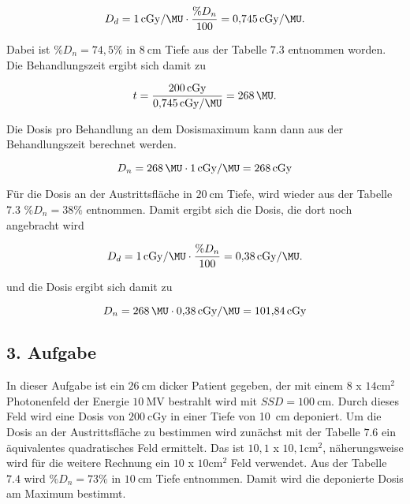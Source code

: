 \begin{equation*}
  D_d = \SI{1}{\centi\gray\per\MU} \cdot \frac{\%D_n}{100} = \SI{0.745}{\centi\gray\per\MU}.
\end{equation*}

Dabei ist $\%D_n = 74,5 \%$ in $\SI{8}{\centi\meter}$ Tiefe aus der
Tabelle $7.3$
entnommen worden.
Die Behandlungszeit ergibt sich damit zu

\begin{equation*}
  t = \frac{\SI{200}{\centi\gray}}{\SI{0.745}{\centi\gray\per\MU}} = \SI{268}{\MU}.
\end{equation*}

Die Dosis pro Behandlung an dem Dosismaximum kann dann aus der Behandlungszeit
berechnet werden.

\begin{equation*}
  D_n = \SI{268}{\MU} \cdot \SI{1}{\centi\gray\per\MU} = \SI{268}{\centi\gray}
\end{equation*}

Für die Dosis an der Austrittsfläche in $\SI{20}{\centi\meter}$ Tiefe,
wird wieder aus der Tabelle $7.3$ $\%D_n = 38\%$ entnommen.
Damit ergibt sich die Dosis, die dort noch angebracht wird

\begin{equation*}
    D_d = \SI{1}{\centi\gray\per\MU} \cdot \frac{\%D_n}{100} = \SI{0.38}{\centi\gray\per\MU}.
\end{equation*}

und die Dosis ergibt sich damit zu

\begin{equation*}
  D_n = \SI{268}{\MU} \cdot \SI{0.38}{\centi\gray\per\MU} = \SI{101,84}{\centi\gray}
\end{equation*}

\subsection*{3. Aufgabe}

In dieser Aufgabe ist ein $\SI{26}{\centi\meter}$ dicker Patient gegeben, der
mit einem $8$ x $14 \si{\centi\meter\squared}$ Photonenfeld der Energie
$\SI{10}{\mega\volt}$ bestrahlt wird mit $SSD = \SI{100}{\centi\meter}$.
Durch dieses Feld wird eine Dosis von $\SI{200}{\centi\gray}$ in einer Tiefe
von \SI{10}{\centi\meter} deponiert. Um die Dosis an der Austrittsfläche zu
bestimmen wird zunächst mit der Tabelle $7.6$ ein äquivalentes quadratisches
Feld ermittelt. Das ist $10,1$ x $10,1 \si{\centi\meter\squared}$,
näherungsweise wird für die weitere Rechnung ein $10$ x $10
\si{\centi\meter\squared}$ Feld verwendet. Aus der Tabelle $7.4$ wird
$\%D_n=73\%$ in $\SI{10}{\centi\meter}$ Tiefe entnommen. Damit wird die
deponierte Dosis am Maximum bestimmt.

